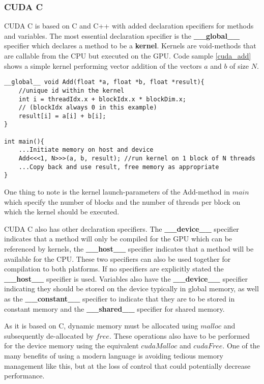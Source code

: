 \subsubsection{CUDA C}
CUDA C is based on C and C++ with added declaration specifiers for methods and variables. 
The most essential declaration specifier is the \textbf{\_\_global\_\_} specifier which declares a method to be a \textbf{kernel}. 
Kernels are void-methods that are callable from the CPU but executed on the GPU. 
Code sample \ref{cuda_add} shows a simple kernel performing vector addition of the vectors $a$ and $b$ of size $N$.
\begin{lstlisting}[language=cudac, caption=CUDA C addition kernel, label=cuda_add]
__global__ void Add(float *a, float *b, float *result){
	//unique id within the kernel
	int i = threadIdx.x + blockIdx.x * blockDim.x;
	// (blockIdx always 0 in this example)
	result[i] = a[i] + b[i];
}

int main(){
	...Initiate memory on host and device
	Add<<<1, N>>>(a, b, result); //run kernel on 1 block of N threads
	...Copy back and use result, free memory as appropriate
}
\end{lstlisting}

One thing to note is the kernel launch-parameters of the Add-method in $main$ which specify the number of blocks and the number of threads per block on which the kernel should be executed. 

CUDA C also has other declaration specifiers. 
The \textbf{\_\_device\_\_} specifier indicates that a method will only be compiled for the GPU which can be referenced by kernels, the \textbf{\_\_host\_\_} specifier indicates that a method will be available for the CPU.
These two specifiers can also be used together for compilation to both platforms.
If no specifiers are explicitly stated the \textbf{\_\_host\_\_} specifier is used.
Variables also have the \textbf{\_\_device\_\_} specifier indicating they should be stored on the device typically in global memory, as well as the \textbf{\_\_constant\_\_} specifier to indicate that they are to be stored in constant memory and the \textbf{\_\_shared\_\_} specifier for shared memory.

As it is based on C, dynamic memory must be allocated using $malloc$ and subsequently de-allocated by $free$.
These operations also have to be performed for the device memory using the equivalent $cudaMalloc$ and $cudaFree$.
One of the many benefits of using a modern language is avoiding tedious memory management like this, but at the loss of control that could potentially decrease performance.

